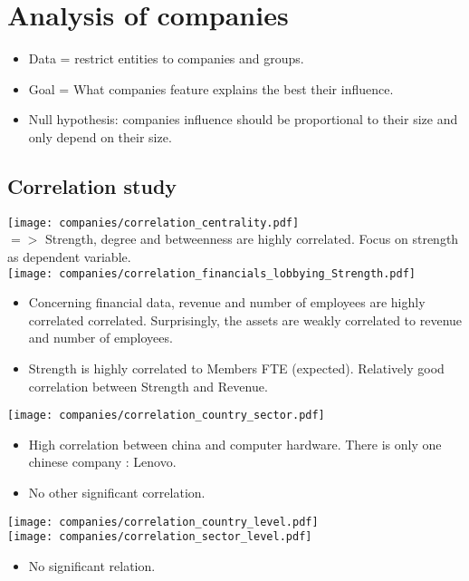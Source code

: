 \documentclass[ 11pt]{article}
\begin{document}
\section{Analysis of companies}
\begin{itemize}
	\item Data = restrict entities to companies and groups.
	\item Goal = What companies feature explains the best their influence. 
	\item Null hypothesis: companies influence should be proportional to their size and only depend on their size. 
\end{itemize}
\subsection{Correlation study}
\texttt{[image: companies/correlation\_centrality.pdf]}\\
 $=> $ Strength, degree and betweenness are highly correlated. Focus on strength as dependent variable.\\

\texttt{[image: companies/correlation\_financials\_lobbying\_Strength.pdf]}
\begin{itemize}
	\item Concerning financial data, revenue and number of employees are  highly correlated correlated. Surprisingly, the assets are weakly correlated to revenue and number of employees.
	\item Strength is highly correlated to Members FTE (expected). Relatively good correlation between Strength and Revenue.
\end{itemize}

\texttt{[image: companies/correlation\_country\_sector.pdf]}
	\begin{itemize}
		\item High correlation between china and computer hardware. There is only one chinese company : Lenovo.  
		\item No other significant correlation.
	\end{itemize}

\texttt{[image: companies/correlation\_country\_level.pdf]}\\
\texttt{[image: companies/correlation\_sector\_level.pdf]}

\begin{itemize}
	\item No significant relation.
	\end{itemize}
	
\end{document}
